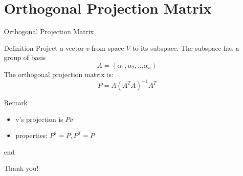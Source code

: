 \documentclass{beamer}
\begin{document}
\section{Orthogonal Projection Matrix}
\begin{frame}[label=5]{Orthogonal Projection Matrix}
        \begin{block}{Definition} 
        Project a vector $v$ from space $V$ to its subspace. The subspace has a group of basis
        \begin{equation*}
            A=(\alpha_1,\alpha_2,\dots\alpha_n)
        \end{equation*}
        The orthogonal projection matrix is:
        \begin{equation*}
            P=A(A^TA)^{-1}A^T
        \end{equation*}
        \end{block}
        \begin{block}{Remark}
            \begin{itemize}
                \item v's projection is $Pv$
                \item properties: $P^2=P,P^T=P$
            \end{itemize}
        \end{block}
\end{frame}
    


\begin{frame}{\textcolor{green!30!black}{end}}
    \begin{center}
        \LARGE Thank you!
    \end{center}
\end{frame}
\end{document}
